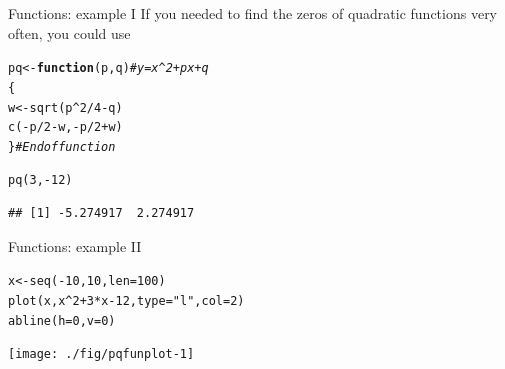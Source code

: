\documentclass[xcolor=table,       handout,    xcolor=dvipsnames]{beamer}\usepackage[]{graphicx}\usepackage[]{color}
\makeatletter
\newcommand{\hlnum}[1]{\textcolor[rgb]{0,0,0}{#1}}
\newcommand{\hlstr}[1]{\textcolor[rgb]{0.545,0.137,0.137}{#1}}
\newcommand{\hlcom}[1]{\textcolor[rgb]{0,0.392,0}{\textit{#1}}}
\newcommand{\hlopt}[1]{\textcolor[rgb]{0,0,0}{#1}}
\newcommand{\hlstd}[1]{\textcolor[rgb]{0,0,0}{#1}}
\newcommand{\hlkwa}[1]{\textcolor[rgb]{1,0,0}{\textbf{#1}}}
\newcommand{\hlkwb}[1]{\textcolor[rgb]{0,0,0}{#1}}
\newcommand{\hlkwc}[1]{\textcolor[rgb]{1,0,1}{#1}}
\newcommand{\hlkwd}[1]{\textcolor[rgb]{0,0,1}{#1}}
\newenvironment{kframe}{%
 \def\at@end@of@kframe{}%
 \ifinner\ifhmode%
  \def\at@end@of@kframe{\end{minipage}}%
  \begin{minipage}{\columnwidth}%
 \fi\fi%
 \def\FrameCommand##1{\hskip\@totalleftmargin \hskip-\fboxsep
 \colorbox{shadecolor}{##1}\hskip-\fboxsep
     \hskip-\linewidth \hskip-\@totalleftmargin \hskip\columnwidth}%
 \MakeFramed {\advance\hsize-\width
   \@totalleftmargin\z@ \linewidth\hsize
   \@setminipage}}%
 {\par\unskip\endMakeFramed%
 \at@end@of@kframe}
\newenvironment{knitrout}{}{} %
\makeatother
\begin{document}
\begin{frame}[fragile]{Functions: example I}
If you needed to find the zeros of quadratic functions very often, you could use
\begin{knitrout}
\color{fgcolor}\begin{kframe}
\begin{alltt}
\hlstd{pq} \hlkwb{<-} \hlkwa{function}\hlstd{(}\hlkwc{p}\hlstd{,}\hlkwc{q}\hlstd{)} \hlcom{# y = x^2 + px + q}
              \hlstd{\{}
              \hlstd{w} \hlkwb{<-} \hlkwd{sqrt}\hlstd{( p}\hlopt{^}\hlnum{2} \hlopt{/} \hlnum{4} \hlopt{-} \hlstd{q )}
              \hlkwd{c}\hlstd{(}\hlopt{-}\hlstd{p}\hlopt{/}\hlnum{2}\hlopt{-}\hlstd{w,} \hlopt{-}\hlstd{p}\hlopt{/}\hlnum{2}\hlopt{+}\hlstd{w)}
              \hlstd{\}} \hlcom{# End of function}

\hlkwd{pq}\hlstd{(}\hlnum{3}\hlstd{,} \hlopt{-}\hlnum{12}\hlstd{)}
\end{alltt}
\begin{verbatim}
## [1] -5.274917  2.274917
\end{verbatim}
\end{kframe}
\end{knitrout}
\end{frame}


\begin{frame}[fragile]{Functions: example II}
\begin{knitrout}
\color{fgcolor}\begin{kframe}
\begin{alltt}
\hlstd{x} \hlkwb{<-} \hlkwd{seq}\hlstd{(}\hlopt{-}\hlnum{10}\hlstd{,} \hlnum{10}\hlstd{,} \hlkwc{len}\hlstd{=}\hlnum{100}\hlstd{)}
\hlkwd{plot}\hlstd{(x,  x}\hlopt{^}\hlnum{2} \hlopt{+}\hlnum{3}\hlopt{*}\hlstd{x} \hlopt{-}\hlnum{12}\hlstd{,} \hlkwc{type}\hlstd{=}\hlstr{"l"}\hlstd{,} \hlkwc{col}\hlstd{=}\hlnum{2}\hlstd{)}
\hlkwd{abline}\hlstd{(}\hlkwc{h}\hlstd{=}\hlnum{0}\hlstd{,} \hlkwc{v}\hlstd{=}\hlnum{0}\hlstd{)}
\end{alltt}
\end{kframe}

{\centering \texttt{[image: ./fig/pqfunplot-1]} 

}



\end{knitrout}
\end{frame}
\end{document}
